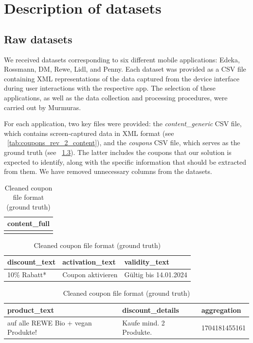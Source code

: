 \documentclass[licencjacka,en]{pracamgr}
\begin{document}
\chapter{Description of datasets} \label{chap:datasets}
\section{Raw datasets} 
We received datasets corresponding to six different mobile applications: Edeka, Rossmann, DM, Rewe, Lidl, and Penny. Each dataset was provided as a CSV file containing XML representations of the data captured from the device interface during user interactions with the respective app. The selection of these applications, as well as the data collection and processing procedures, were carried out by Murmuras.

For each application, two key files were provided: the \textit{content\_generic} CSV file, which contains screen-captured data in XML format (see ~\ref{tab:coupons_rev_2_content}), and the \textit{coupons} CSV file, which serves as the ground truth (see ~\ref{tab:coupons_rev_2}). The latter includes the coupons that our solution is expected to identify, along with the specific information that should be extracted from them. We have removed unnecessary columns from the datasets.


\begin{table}[ht]
\centering

\begin{tabular}{|p{}|}
\hline
\textbf{content\_full} \\
\hline
[Treuepunkte, 10\% Rabatt*, auf alle REWE Bio + vegan Produkte!, 
Kaufe mind. 2 Produkte., Gültig bis 14.01.2024, Coupon aktivieren] \\
\hline
\end{tabular}

\vspace{1em}

\begin{tabular}{|l|l|l|}
\hline
\textbf{discount\_text} & \textbf{activation\_text} & \textbf{validity\_text} \\
\hline
10\% Rabatt* & Coupon aktivieren & Gültig bis 14.01.2024 \\
\hline
\end{tabular}

\vspace{1em}

\begin{tabular}{|l|l|l|}
\hline
\textbf{product\_text} & \textbf{discount\_details} & \textbf{aggregation} \\
\hline
auf alle REWE Bio + vegan Produkte! & Kaufe mind. 2 Produkte. & 1704181455161 \\
\hline
\end{tabular}

\caption{Cleaned coupon file format (ground truth)}
\label{tab:coupons_rev_2}
\end{table}
\end{document}
